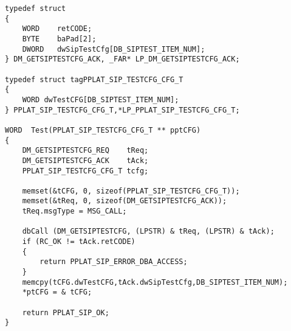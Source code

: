﻿\documentclass  [11pt,onecolumn]{article}
\begin{document}
\begin{lstlisting}
typedef struct
{
    WORD    retCODE;
    BYTE    baPad[2];
    DWORD   dwSipTestCfg[DB_SIPTEST_ITEM_NUM]; 
} DM_GETSIPTESTCFG_ACK, _FAR* LP_DM_GETSIPTESTCFG_ACK;

typedef struct tagPPLAT_SIP_TESTCFG_CFG_T
{
    WORD dwTestCFG[DB_SIPTEST_ITEM_NUM];   
} PPLAT_SIP_TESTCFG_CFG_T,*LP_PPLAT_SIP_TESTCFG_CFG_T;

WORD  Test(PPLAT_SIP_TESTCFG_CFG_T ** pptCFG)
{
    DM_GETSIPTESTCFG_REQ    tReq;
    DM_GETSIPTESTCFG_ACK    tAck;
    PPLAT_SIP_TESTCFG_CFG_T tcfg;
       
    memset(&tCFG, 0, sizeof(PPLAT_SIP_TESTCFG_CFG_T));
    memset(&tReq, 0, sizeof(DM_GETSIPTESTCFG_ACK));
    tReq.msgType = MSG_CALL;

    dbCall (DM_GETSIPTESTCFG, (LPSTR) & tReq, (LPSTR) & tAck);
    if (RC_OK != tAck.retCODE)
    {
        return PPLAT_SIP_ERROR_DBA_ACCESS;
    }
    memcpy(tCFG.dwTestCFG,tAck.dwSipTestCfg,DB_SIPTEST_ITEM_NUM);
	*ptCFG = & tCFG;

    return PPLAT_SIP_OK;
}
\end{lstlisting}
\end{document}
